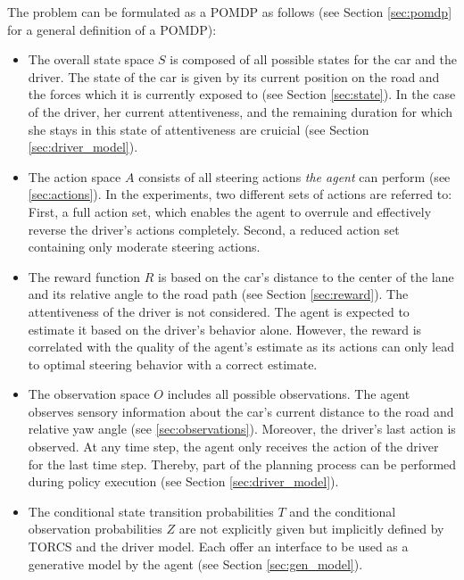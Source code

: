 The problem can be formulated as a POMDP as follows (see Section \ref{sec:pomdp} for a general definition of a POMDP):
\begin{itemize}
    \item The overall state space $S$ is composed of all possible states for the car and the driver. The state of the car is given by its current position on the road and the forces which it is currently exposed to (see Section \ref{sec:state}). In the case of the driver, her current attentiveness, and the remaining duration for which she stays in this state of attentiveness are cruicial (see Section \ref{sec:driver_model}).
    \item The action space $A$ consists of all steering actions \emph{the agent} can perform (see \ref{sec:actions}). In the experiments, two different sets of actions are referred to: First, a full action set, which enables the agent to overrule and effectively reverse the driver's actions completely. Second, a reduced action set containing only moderate steering actions.
    \item The reward function $R$ is based on the car's distance to the center of the lane and its relative angle to the road path (see Section \ref{sec:reward}). The attentiveness of the driver is not considered. The agent is expected to estimate it based on the driver's behavior alone. However, the reward is correlated with the quality of the agent's estimate as its actions can only lead to optimal steering behavior with a correct estimate.
    \item The observation space $O$ includes all possible observations. The agent observes sensory information about the car's current distance to the road and relative yaw angle (see \ref{sec:observations}). Moreover, the driver's last action is observed. At any time step, the agent only receives the action of the driver for the last time step. Thereby, part of the planning process can be performed during policy execution (see Section \ref{sec:driver_model}).
    \item The conditional state transition probabilities $T$ and the conditional observation probabilities $Z$ are not explicitly given but implicitly defined by TORCS and the driver model. Each offer an interface to be used as a generative model by the agent (see Section \ref{sec:gen_model}).
\end{itemize}


